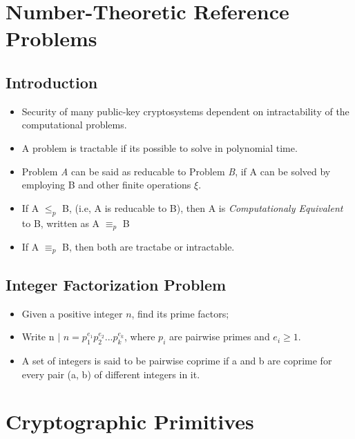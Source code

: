 \documentclass[12pt]{article}
\begin{document}
\maketitle
\pagebreak


\section{Number-Theoretic Reference Problems}
\subsection{Introduction}
\begin{itemize}
\item Security of many public-key cryptosystems dependent on intractability of the computational problems.
\item A problem is tractable if its possible to solve in polynomial time.
\item Problem \textit{A} can be said as reducable to Problem \textit{B}, if A can be solved by employing B and other finite operations $\xi.$
\item If A $\leq_{p}$ B, (i.e, A is reducable to B), then A is \textit{Computationaly Equivalent} to B, written as A $\equiv_{p}$ B
\item If  A $\equiv_{p}$ B, then both are tractabe or intractable.
\end{itemize} 

\subsection{Integer Factorization Problem}
\begin{itemize}
\item Given a positive integer $\textit{n}$, find its prime factors;
\item Write n $\mid$ $n = p_{1}^{e_{1}}p_{2}^{e_{2}}...p_{k}^{e_{k}}$, where $p_{i}$ are pairwise primes and $e_{i} \geq 1.$
\item  A set of integers is said to be pairwise coprime if a and b are coprime for every pair (a, b) of different integers in it.
\end{itemize}

\section{Cryptographic Primitives}
\end{document}
